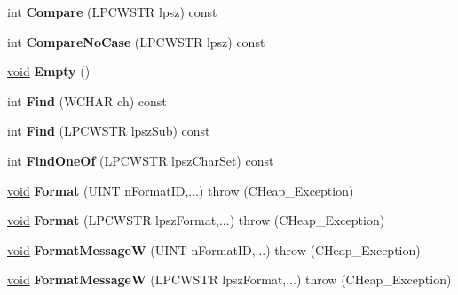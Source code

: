 \begin{DoxyCompactItemize}
\item 
\mbox{\label{class_c_h_string_a7eb218aa90fcc2f69673bd3b3ca17807}} 
int {\bfseries Compare} (L\+P\+C\+W\+S\+TR lpsz) const
\item 
\mbox{\label{class_c_h_string_a55027e78489d4ff1c03526680ad5e562}} 
int {\bfseries Compare\+No\+Case} (L\+P\+C\+W\+S\+TR lpsz) const
\item 
\mbox{\label{class_c_h_string_aae7509cc8fbba3eee7ce0aa168f1e037}} 
\hyperlink{interfacevoid}{void} {\bfseries Empty} ()
\item 
\mbox{\label{class_c_h_string_a9c8258e777ea7fae3026baa54f136b0e}} 
int {\bfseries Find} (W\+C\+H\+AR ch) const
\item 
\mbox{\label{class_c_h_string_a8348c859e4e896c0c3576a32f0673e0d}} 
int {\bfseries Find} (L\+P\+C\+W\+S\+TR lpsz\+Sub) const
\item 
\mbox{\label{class_c_h_string_ab761d8f57411267e0f8792a0ce563f3b}} 
int {\bfseries Find\+One\+Of} (L\+P\+C\+W\+S\+TR lpsz\+Char\+Set) const
\item 
\mbox{\label{class_c_h_string_aef3ba0abd3a76fa80814cd3f36039b79}} 
\hyperlink{interfacevoid}{void} {\bfseries Format} (U\+I\+NT n\+Format\+ID,...)  throw (\+C\+Heap\+\_\+\+Exception)
\item 
\mbox{\label{class_c_h_string_ae3741bae76f127d81c272989aca5934e}} 
\hyperlink{interfacevoid}{void} {\bfseries Format} (L\+P\+C\+W\+S\+TR lpsz\+Format,...)  throw (\+C\+Heap\+\_\+\+Exception)
\item 
\mbox{\label{class_c_h_string_a7c7801665928dc7686d69eb07e15754c}} 
\hyperlink{interfacevoid}{void} {\bfseries Format\+MessageW} (U\+I\+NT n\+Format\+ID,...)  throw (\+C\+Heap\+\_\+\+Exception)
\item 
\mbox{\label{class_c_h_string_ad7e306ae4e2830c346ce8dcf0ace2ada}} 
\hyperlink{interfacevoid}{void} {\bfseries Format\+MessageW} (L\+P\+C\+W\+S\+TR lpsz\+Format,...)  throw (\+C\+Heap\+\_\+\+Exception)

\end{DoxyCompactItemize}
